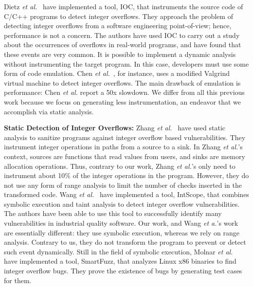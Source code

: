 \documentclass{sigplanconf}[10pt]
\begin{document}
Dietz {\em et al.}~\cite{Dietz12} have 
implemented a tool, IOC, that instruments the source code of C/C++ programs to
detect integer overflows.
They approach the problem of detecting integer overflows from a software
engineering point-of-view; hence, performance is not a concern.
The authors have used IOC to carry out a study about the occurrences
of overflows in real-world programs, and have found that these events are very
common.
It is possible to implement a dynamic analysis without instrumenting the
target program.
In this case, developers must use some form of code emulation.
Chen {\em et al.}~\cite{Chen09}, for instance, uses a modified
Valgrind~\cite{Nethercote07} virtual machine to detect integer overflows.
The main drawback of emulation is performance: Chen {\em et al.} report a
50x slowdown.
We differ from all this previous work because we focus on generating less
instrumentation, an endeavor that we accomplish via static analysis.

\noindent
\textbf{Static Detection of Integer Overflows: }
Zhang {\em et al.}~\cite{Zhang10} have used static analysis to sanitize
programs against integer overflow based vulnerabilities.
They instrument integer operations in paths from a source to a sink.
In Zhang {\em et al.}'s context, sources are functions that read values from
users, and sinks are memory allocation operations.
Thus, contrary to our work, Zhang {\em et al.}'s only need to instrument
about 10\% of the integer operations in the program.
However, they do not use any form of range analysis to limit the number of
checks inserted in the transformed code.
Wang {\em et al.}~\cite{Wang09} have implemented a tool, IntScope, that combines symbolic execution and taint analysis to detect integer overflow vulnerabilities. The authors have been able to use this tool to successfully identify many vulnerabilities in industrial quality software. Our work, and Wang {\em et a.}'s work are essentially different: they use symbolic execution, whereas we rely on
range analysis.
Contrary to us, they do not transform the program to prevent or detect such event dynamically.
Still in the field of symbolic execution, Molnar
{\em et al.}~\cite{Molnar09} have implemented a tool, SmartFuzz, that analyzes
Linux x86 binaries to find integer overflow bugs.
They prove the existence of bugs by generating test cases for them.
\end{document}
